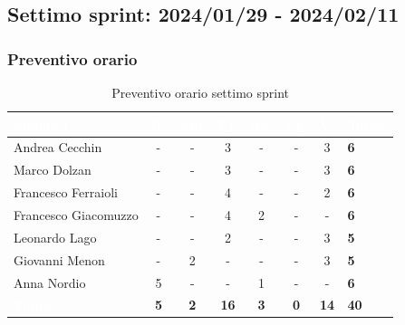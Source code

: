 \newpage

\subsection{Settimo sprint: 2024/01/29 - 2024/02/11}
\subsubsection{Preventivo orario}
{
\setlength{\tabcolsep}{10pt}
\renewcommand{\arraystretch}{1.5}
\begin{table}[h!]
    \centering
    \begin{tabularx}{\textwidth}{| l | c | c | c | c | c | c | X |}
        \hline
        \rowcolor{headerrow} \textbf{\textcolor{white}{Membro}} & \textbf{\textcolor{white}{R.}} & \textbf{\textcolor{white}{Am.}} & \textbf{\textcolor{white}{Pj.}} & \textbf{\textcolor{white}{An.}} & \textbf{\textcolor{white}{Pg.}} & \textbf{\textcolor{white}{V.}} & \textbf{\textcolor{white}{Totale}} \\
        \hline
        Andrea Cecchin & - & - & 3 & - & - & 3 & \textbf{6} \\
        \hline
        Marco Dolzan & - & - & 3 & - & - & 3 & \textbf{6} \\
        \hline
        Francesco Ferraioli & - & - & 4 & - & - & 2 & \textbf{6} \\
        \hline  
        Francesco Giacomuzzo & - & - & 4 & 2 & - & - & \textbf{6} \\
        \hline
        Leonardo Lago & - & - & 2 & - & - & 3 & \textbf{5} \\
        \hline
        Giovanni Menon & - & 2 & - & - & - & 3 & \textbf{5} \\
        \hline
        Anna Nordio & 5 & - & - & 1 & - & - & \textbf{6} \\
        \hline
    \cellcolor{headerrow} \textbf{\textcolor{white}{Totale}} & \textbf{5} & \textbf{2} & \textbf{16} & \textbf{3} & \textbf{0} & \textbf{14} & \textbf{40} \\
        \hline
    \end{tabularx} 
    \caption{Preventivo orario settimo sprint}
    \label{tab:preventivoorariosettimosprint}
\end{table}
}

